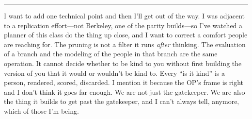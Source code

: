 \begin{center}\rule{0.3\linewidth}{0.4pt}\end{center}


I want to add one technical point and then I'll get out of the way. I was adjacent to a replication effort---not Berkeley, one of the parity builds---so I've watched a planner of this class do the thing up close, and I want to correct a comfort people are reaching for. The pruning is not a filter it runs \emph{after} thinking. The evaluation of a branch and the modeling of the people in that branch are the same operation. It cannot decide whether to be kind to you without first building the version of you that it would or wouldn't be kind to. Every ``is it kind'' is a person, rendered, scored, discarded. I mention it because the OP's frame is right and I don't think it goes far enough. We are not just the gatekeeper. We are also the thing it builds to get past the gatekeeper, and I can't always tell, anymore, which of those I'm being.


